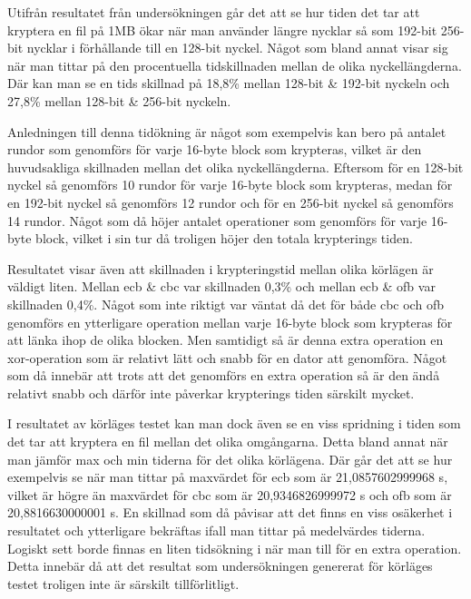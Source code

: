 \label{chap:discussion}

Utifrån resultatet från undersökningen går det att se hur tiden det tar att kryptera en fil på 1MB ökar när man använder längre nycklar så som 192-\gls{bit} 256-\gls{bit} nycklar
i förhållande till en 128-\gls{bit} nyckel. Något som bland annat visar sig när man tittar på den procentuella tidskillnaden mellan de olika nyckellängderna. Där kan man se en
tids skillnad på 18,8\% mellan 128-\gls{bit} \& 192-\gls{bit} nyckeln och 27,8\% mellan 128-\gls{bit} \& 256-\gls{bit} nyckeln.

Anledningen till denna tidökning är något som exempelvis kan bero på antalet rundor som genomförs för varje 16-\gls{byte} block som krypteras, vilket är den huvudsakliga
skillnaden mellan det olika nyckellängderna. Eftersom för en 128-\gls{bit} nyckel så genomförs 10 rundor för varje 16-\gls{byte} block som krypteras, medan för en 192-\gls{bit}
nyckel så genomförs 12 rundor och för en 256-\gls{bit} nyckel så genomförs 14 rundor. Något som då höjer antalet operationer som genomförs för varje 16-\gls{byte} block, vilket
i sin tur då troligen höjer den totala krypterings tiden.

Resultatet visar även att skillnaden i krypteringstid mellan olika körlägen är väldigt liten. Mellan \acrshort{ecb} \& \acrshort{cbc} var skillnaden 0,3\% och mellan \acrshort{ecb}
\& \acrshort{ofb} var skillnaden 0,4\%. Något som inte riktigt var väntat då det för både \acrshort{cbc} och \acrshort{ofb}
genomförs en ytterligare operation mellan varje 16-\gls{byte} block som krypteras för att länka ihop de olika blocken. Men samtidigt så är denna extra operation en \gls{xor}-operation
som är relativt lätt och snabb för en dator att genomföra. Något som då innebär att trots att det genomförs en extra operation så är den ändå relativt snabb och därför inte
påverkar krypterings tiden särskilt mycket.

I resultatet av körläges testet kan man dock även se en viss spridning i tiden som det tar att kryptera en fil mellan det olika omgångarna. Detta bland annat när man jämför
max och min tiderna för det olika körlägena. Där går det att se hur exempelvis se när man tittar på maxvärdet för \acrshort{ecb} som är 21,0857602999968 s, vilket är högre än
maxvärdet för \acrshort{cbc} som är 20,9346826999972 s och \acrshort{ofb} som är 20,8816630000001 s. En skillnad som då påvisar att det finns en viss osäkerhet i
resultatet och ytterligare bekräftas ifall man tittar på medelvärdes tiderna.
Logiskt sett borde finnas en liten tidsökning i när man till för en extra operation. Detta innebär då att det resultat som undersökningen genererat för
körläges testet troligen inte är särskilt tillförlitligt.

